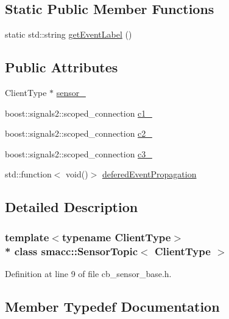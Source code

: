 \subsection*{Static Public Member Functions}
\begin{DoxyCompactItemize}
\item 
static std\+::string \hyperlink{classsmacc_1_1SensorTopic_a6e6383e4d7b00603a33ca2598f03e0fb}{get\+Event\+Label} ()
\end{DoxyCompactItemize}
\subsection*{Public Attributes}
\begin{DoxyCompactItemize}
\item 
Client\+Type $\ast$ \hyperlink{classsmacc_1_1SensorTopic_affbf010b80f779369dd14d786c1ed9e3}{sensor\+\_\+}
\item 
boost\+::signals2\+::scoped\+\_\+connection \hyperlink{classsmacc_1_1SensorTopic_a2700ebd50bc0f4eb1519ecf2d9b8696d}{c1\+\_\+}
\item 
boost\+::signals2\+::scoped\+\_\+connection \hyperlink{classsmacc_1_1SensorTopic_a99fd05ee6d84ddeb4ffa7ef51ddc0567}{c2\+\_\+}
\item 
boost\+::signals2\+::scoped\+\_\+connection \hyperlink{classsmacc_1_1SensorTopic_ae95d0b3f4d9d419b6c4367265c002826}{c3\+\_\+}
\item 
std\+::function$<$ void()$>$ \hyperlink{classsmacc_1_1SensorTopic_ad9c462b8458e9b3c4b38404adbb5f067}{defered\+Event\+Propagation}
\end{DoxyCompactItemize}


\subsection{Detailed Description}
\subsubsection*{template$<$typename Client\+Type$>$\\*
class smacc\+::\+Sensor\+Topic$<$ Client\+Type $>$}



Definition at line 9 of file cb\+\_\+sensor\+\_\+base.\+h.



\subsection{Member Typedef Documentation}
